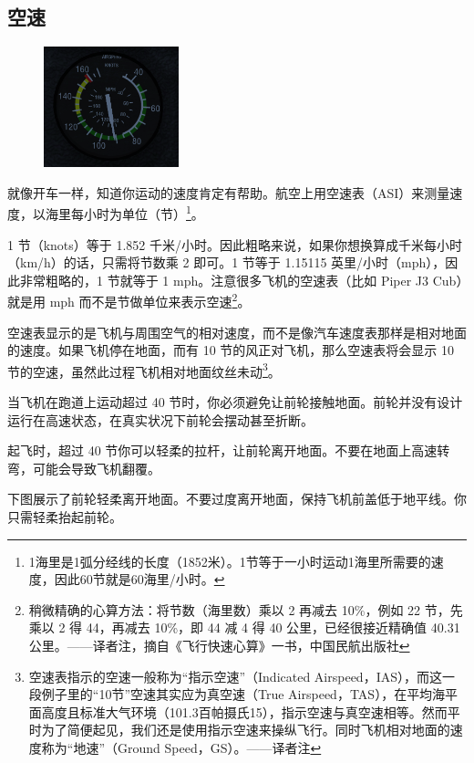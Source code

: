 \subsection{空速}
\begin{figure}
  \includegraphics[width=0.35\textwidth]{img/basic_tutorial/airspeed}
\end{figure}

就像开车一样，知道你运动的速度肯定有帮助。航空上用空速表（ASI）来测量速度，以海里每小时为单位（节）\footnote{1海里是1弧分经线的长度（1852米）。1节等于一小时运动1海里所需要的速度，因此60节就是60海里/小时。}。

1 节（knots）等于 1.852 千米/小时。因此粗略来说，如果你想换算成千米每小时（km/h）的话，只需将节数乘 2 即可。1 节等于 1.15115 英里/小时（mph），因此非常粗略的，1 节就等于 1 mph。注意很多飞机的空速表（比如 Piper J3 Cub）就是用 mph 而不是节做单位来表示空速\footnote{稍微精确的心算方法：将节数（海里数）乘以 2 再减去 10\%，例如 22 节，先乘以 2 得 44，再减去 10\%，即 44 减 4 得 40 公里，已经很接近精确值 40.31 公里。——译者注，摘自《飞行快速心算》一书，中国民航出版社}。

空速表显示的是飞机与周围空气的相对速度，而不是像汽车速度表那样是相对地面的速度。如果飞机停在地面，而有 10 节的风正对飞机，那么空速表将会显示 10 节的空速，虽然此过程飞机相对地面纹丝未动\footnote{空速表指示的空速一般称为“指示空速”（Indicated Airspeed，IAS），而这一段例子里的“10节”空速其实应为真空速（True Airspeed，TAS），在平均海平面高度且标准大气环境（101.3百帕摄氏15\textdegree{}），指示空速与真空速相等。然而平时为了简便起见，我们还是使用指示空速来操纵飞行。同时飞机相对地面的速度称为“地速”（Ground Speed，GS）。——译者注}。

当飞机在跑道上运动超过 40 节时，你必须避免让前轮接触地面。前轮并没有设计运行在高速状态，在真实状况下前轮会摆动甚至折断。

起飞时，超过 40 节你可以轻柔的拉杆，让前轮离开地面。不要在地面上高速转弯，可能会导致飞机翻覆。

下图展示了前轮轻柔离开地面。不要过度离开地面，保持飞机前盖低于地平线。你只需轻柔抬起前轮。


